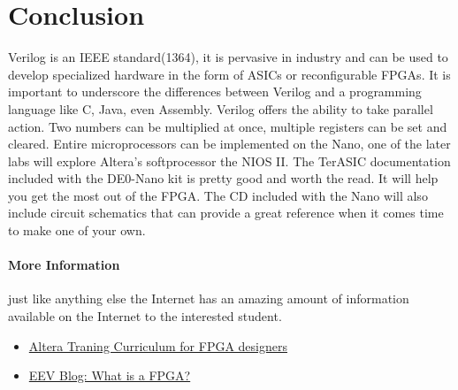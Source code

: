 \documentclass[12pt,journal]{IEEEtran}
\begin{document}
  \section{\bfseries Conclusion}
    Verilog is an IEEE standard(1364)\cite{Wikipedia:Verilog}, it is pervasive in industry and can be used to develop specialized hardware
    in the form of ASICs or reconfigurable FPGAs. It is important to underscore the differences between Verilog
    and a programming language like C, Java, even Assembly. Verilog offers the ability to take parallel action.
    Two numbers can be multiplied at once, multiple registers can be set and cleared. Entire microprocessors can
    be implemented on the Nano, one of the later labs will explore Altera's softprocessor the NIOS II. The TerASIC
    documentation included with the DE0-Nano kit is pretty good and worth the read. It will help you get the most
    out of the FPGA. The CD included with the Nano will also include circuit schematics that can provide a great
    reference when it comes time to make one of your own.
    
    \paragraph{\bfseries More Information} just like anything else the Internet has an amazing amount of information available
    on the Internet to the interested student. 
      \begin{itemize}
        \item \href{http://www.altera.com/education/training/curriculum/fpga/trn-fpga.html}{Altera Traning Curriculum for FPGA designers}
        \item \href{www.eevblog.com}{EEV Blog: What is a FPGA?}
      \end{itemize}

  
  
\end{document}
